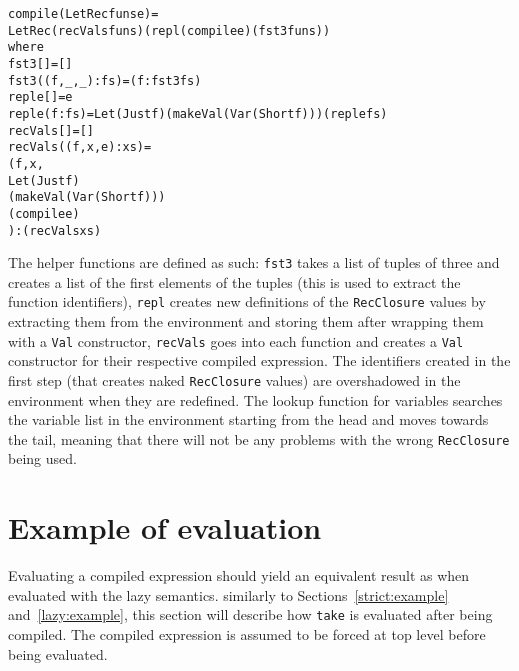 \begin{alltt}
  compile (LetRec funs e) =
    LetRec (recVals funs) (repl (compile e) (fst3 funs))
    where
      fst3 []           = []
      fst3 ((f,_,_):fs) = (f:fst3 fs)
      repl e []     = e
      repl e (f:fs) = Let (Just f) (makeVal (Var (Short f))) (repl e fs)
      recVals []           = []
      recVals ((f,x,e):xs) =
        (f,x,
         Let (Just f)
         (makeVal (Var (Short f)))
         (compile e)
        ):(recVals xs)
\end{alltt}

\noindent The helper functions are defined as such: \texttt{fst3} takes a list
of tuples of three and creates a list of the first elements of the tuples (this
is used to extract the function identifiers), \texttt{repl} creates new
definitions of the \texttt{RecClosure} values by extracting them from the
environment and storing them after wrapping them with a \texttt{Val}
constructor, \texttt{recVals} goes into each function and creates a \texttt{Val}
constructor for their respective compiled expression.
The identifiers created in the first step (that creates naked
\texttt{RecClosure} values) are
overshadowed in the environment when they are redefined. The lookup function
for variables searches the variable list in the environment starting from the
head and moves towards the tail, meaning that there will not be any problems
with the wrong \texttt{RecClosure} being used.

\section{Example of evaluation}
\label{com:example}
Evaluating a compiled expression should yield an equivalent result as when
evaluated with the lazy semantics. similarly to Sections~\ref{strict:example}
and~\ref{lazy:example}, this section will describe how \texttt{take}
is evaluated after being compiled. The compiled expression is assumed to be
forced at top level before being evaluated.

